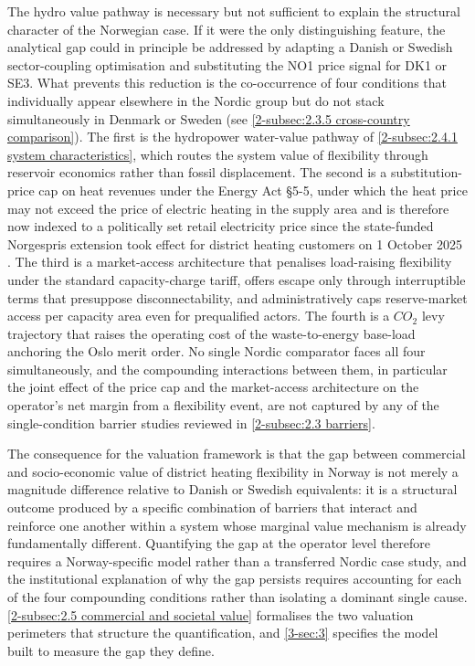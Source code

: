 The hydro value pathway is necessary but not sufficient to explain the structural character of the Norwegian case. If it were the only distinguishing feature, the analytical gap could in principle be addressed by adapting a Danish or Swedish sector-coupling optimisation and substituting the NO1 price signal for DK1 or SE3. What prevents this reduction is the co-occurrence of four conditions that individually appear elsewhere in the Nordic group but do not stack simultaneously in Denmark or Sweden (see \autoref{2-subsec:2.3.5 cross-country comparison}). The first is the hydropower water-value pathway of \autoref{2-subsec:2.4.1 system characteristics}, which routes the system value of flexibility through reservoir economics rather than fossil displacement. The second is a substitution-price cap on heat revenues under the Energy Act §5-5, under which the heat price may not exceed the price of electric heating in the supply area \cite{energidepartementet_lov_1991}  and is therefore now indexed to a politically set retail electricity price since the state-funded Norgespris extension took effect for district heating customers on 1 October 2025 \cite{energidepartementet_forskrift_2025}. The third is a market-access architecture that penalises load-raising flexibility under the standard capacity-charge tariff, offers escape only through interruptible terms that presuppose disconnectability, and administratively caps reserve-market access per capacity area even for prequalified actors. The fourth is a $CO_2$ levy trajectory that raises the operating cost of the waste-to-energy base-load anchoring the Oslo merit order. No single Nordic comparator faces all four simultaneously, and the compounding interactions between them, in particular the joint effect of the price cap and the market-access architecture on the operator's net margin from a flexibility event, are not captured by any of the single-condition barrier studies reviewed in \autoref{2-subsec:2.3 barriers}.

The consequence for the valuation framework is that the gap between commercial and socio-economic value of district heating flexibility in Norway is not merely a magnitude difference relative to Danish or Swedish equivalents: it is a structural outcome produced by a specific combination of barriers that interact and reinforce one another within a system whose marginal value mechanism is already fundamentally different. Quantifying the gap at the operator level therefore requires a Norway-specific model rather than a transferred Nordic case study, and the institutional explanation of why the gap persists requires accounting for each of the four compounding conditions rather than isolating a dominant single cause. \autoref{2-subsec:2.5 commercial and societal value} formalises the two valuation perimeters that structure the quantification, and \autoref{3-sec:3} specifies the model built to measure the gap they define.


